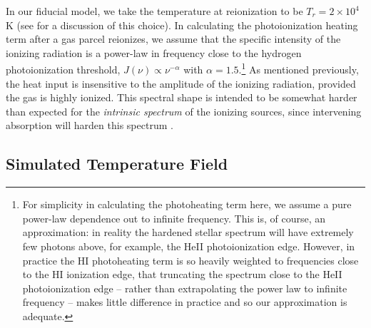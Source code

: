 In our fiducial model, we take the temperature at reionization to be $T_r = 2 \times 10^4$ K (see \citealt{Furlanetto:2009kr,McQuinn:2012bq} for a discussion
of this choice). In calculating the photoionization heating term after a gas parcel reionizes, we assume that the specific
intensity of the ionizing radiation 
is a power-law in frequency close to the hydrogen photoionization threshold, $J(\nu) \propto \nu^{-\alpha}$ with $\alpha=1.5$.\footnote{For simplicity in calculating the photoheating term here, we assume a pure power-law dependence out to infinite frequency. This
is, of course, an approximation: in reality the hardened stellar spectrum will have extremely few photons above, for example,
the HeII photoionization edge. However, in practice the HI photoheating term is so heavily weighted to frequencies close to
the HI ionization edge, that truncating the spectrum close to the HeII photoionization edge -- rather than extrapolating the
power law to infinite frequency -- makes little difference in practice and so our approximation is adequate.}
As mentioned previously, the heat input is insensitive to the amplitude of the ionizing radiation, provided the gas is highly ionized. This spectral shape is intended
to be somewhat harder than expected for the {\em intrinsic spectrum} of the ionizing sources, since intervening absorption will harden
this spectrum \citep{1993ApJ...418...28Z,Hui:2003hn,Furlanetto:2009kr}.


\subsection{Simulated Temperature Field}
\label{sec:IGMTemptemp_sim}

